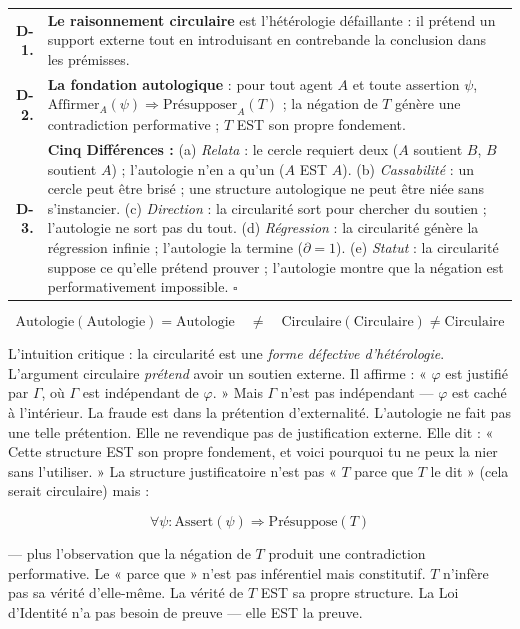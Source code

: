 \documentclass[10pt, openany, oneside]{book}
\renewcommand{\footnotesize}{\fontsize{8.5}{11}\selectfont}
\begin{document}
{\footnotesize
\noindent\begin{tabular}{r p{}}
\textbf{D-1.} & \textbf{Le raisonnement circulaire} est l'hétérologie défaillante : il prétend un support externe tout en introduisant en contrebande la conclusion dans les prémisses. \\[0.3em]
\textbf{D-2.} & \textbf{La fondation autologique} : pour tout agent $A$ et toute assertion $\psi$, $\text{Affirmer}_A(\psi) \Rightarrow \text{Présupposer}_A(T)$ ; la négation de $T$ génère une contradiction performative ; $T$ EST son propre fondement. \\[0.3em]
\textbf{D-3.} & \textbf{Cinq Différences :} (a) \textit{Relata} : le cercle requiert deux ($A$ soutient $B$, $B$ soutient $A$) ; l'autologie n'en a qu'un ($A$ EST $A$). (b) \textit{Cassabilité} : un cercle peut être brisé ; une structure autologique ne peut être niée sans s'instancier. (c) \textit{Direction} : la circularité sort pour chercher du soutien ; l'autologie ne sort pas du tout. (d) \textit{Régression} : la circularité génère la régression infinie ; l'autologie la termine ($\partial = 1$). (e) \textit{Statut} : la circularité suppose ce qu'elle prétend prouver ; l'autologie montre que la négation est performativement impossible. $\square$ \\[0.3em]
\end{tabular}
}

\vspace{0.8em}

$$\boxed{\text{Autologie}(\text{Autologie}) = \text{Autologie} \quad \neq \quad \text{Circulaire}(\text{Circulaire}) \neq \text{Circulaire}}$$

\noindent L'intuition critique : la circularité est une \textit{forme défective d'hétérologie}. L'argument circulaire \textit{prétend} avoir un soutien externe. Il affirme : « $\varphi$ est justifié par $\Gamma$, où $\Gamma$ est indépendant de $\varphi$. » Mais $\Gamma$ n'est pas indépendant --- $\varphi$ est caché à l'intérieur. La fraude est dans la prétention d'externalité. L'autologie ne fait pas une telle prétention. Elle ne revendique pas de justification externe. Elle dit : « Cette structure EST son propre fondement, et voici pourquoi tu ne peux la nier sans l'utiliser. » La structure justificatoire n'est pas « $T$ parce que $T$ le dit » (cela serait circulaire) mais :

$$\forall \psi: \text{Assert}(\psi) \Rightarrow \text{Présuppose}(T)$$

--- plus l'observation que la négation de $T$ produit une contradiction performative. Le « parce que » n'est pas inférentiel mais constitutif. $T$ n'infère pas sa vérité d'elle-même. La vérité de $T$ EST sa propre structure. La Loi d'Identité n'a pas besoin de preuve --- elle EST la preuve.
\end{document}
